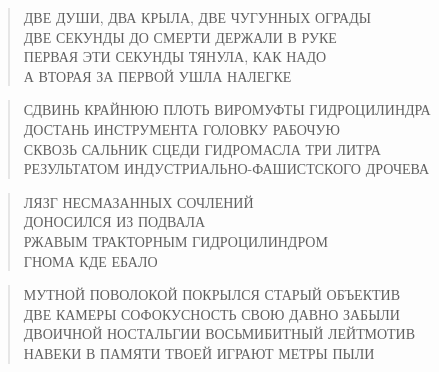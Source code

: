 \poemtitle{***}
\begin{verse}
ДВЕ ДУШИ, ДВА КРЫЛА, ДВЕ ЧУГУННЫХ ОГРАДЫ\\
ДВЕ СЕКУНДЫ ДО СМЕРТИ ДЕРЖАЛИ В РУКЕ\\
ПЕРВАЯ ЭТИ СЕКУНДЫ ТЯНУЛА, КАК НАДО\\
А ВТОРАЯ ЗА ПЕРВОЙ УШЛА НАЛЕГКЕ
\end{verse}

\poemtitle{***}
\begin{verse}
СДВИНЬ КРАЙНЮЮ ПЛОТЬ ВИРОМУФТЫ ГИДРОЦИЛИНДРА \\
ДОСТАНЬ ИНСТРУМЕНТА ГОЛОВКУ РАБОЧУЮ\\
СКВОЗЬ САЛЬНИК СЦЕДИ ГИДРОМАСЛА ТРИ ЛИТРА\\
РЕЗУЛЬТАТОМ ИНДУСТРИАЛЬНО-ФАШИСТСКОГО ДРОЧЕВА
\end{verse}

\poemtitle{***}
\begin{verse}
ЛЯЗГ НЕСМАЗАННЫХ СОЧЛЕНИЙ \\
ДОНОСИЛСЯ ИЗ ПОДВАЛА\\
РЖАВЫМ ТРАКТОРНЫМ ГИДРОЦИЛИНДРОМ\\
ГНОМА КДЕ ЕБАЛО
\end{verse}

\poemtitle{***}
\begin{verse}
МУТНОЙ ПОВОЛОКОЙ ПОКРЫЛСЯ СТАРЫЙ ОБЪЕКТИВ\\
ДВЕ КАМЕРЫ СОФОКУСНОСТЬ СВОЮ ДАВНО ЗАБЫЛИ\\
ДВОИЧНОЙ НОСТАЛЬГИИ ВОСЬМИБИТНЫЙ ЛЕЙТМОТИВ\\
НАВЕКИ В ПАМЯТИ ТВОЕЙ ИГРАЮТ МЕТРЫ ПЫЛИ
\end{verse}

